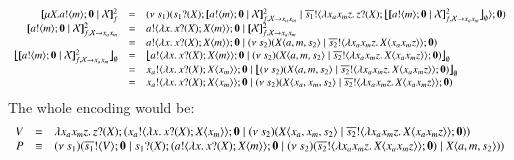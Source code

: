 \[
	\begin{array}{rcl}
		\pmapp{\recp{X}{\bout{a}{m} \inact \Par \rvar{X}}}{2}{f} & = &
		\newsp{s_1}{ \binp{s_1}{X} \pmapp{\bout{a}{m} \inact \Par \rvar{X}}{2}{f, \rvar{X} \rightarrow x_ax_m} \Par \bout{\dual{s_1}}{ \abs{x_a x_m z} \binp{z}{X} \auxmap{\pmapp{\bout{a}{m} \inact \Par \rvar{X}}{2}{f, \rvar{X} \rightarrow x_ax_m}}{\es} } \inact}
		\\

		\pmapp{\bout{a}{m} \inact \Par \rvar{X}}{2}{f, \rvar{X} \rightarrow x_ax_m} &=&
		\bout{a}{\abs{x}{\binp{x}{X} \appl{X}{m}}} \inact \Par \pmapp{\rvar{X}}{2}{f, \rvar{X} \rightarrow x_ax_m}
		\\
		&=& \bout{a}{\abs{x}{\binp{x}{X} \appl{X}{m}}} \inact \Par \newsp{s_2}{\appl{X}{a,m, s_2}  \Par \bout{\dual{s_2}}{\abs{x_a x_m z}{\appl{X}{x_a x_m z}}} \inact}
		\\

		\auxmap{\pmapp{\bout{a}{m} \inact \Par \rvar{X}}{2}{f, \rvar{X} \rightarrow x_ax_m}}{\es} &=&
		\auxmap{\bout{a}{\abs{x}{\binp{x}{X} \appl{X}{m}}} \inact \Par  \newsp{s_2}{\appl{X}{a,m, s_2}  \Par \bout{\dual{s_2}}{\abs{x_a x_m z}{\appl{X}{x_a x_m z}}} \inact}}{\es}
		\\
		& = & \bout{x_a}{\abs{x}{\binp{x}{X} \appl{X}{x_m}}} \inact \Par \auxmap{\newsp{s_2}{\appl{X}{a,m, s_2}  \Par \bout{\dual{s_2}}{\abs{x_a x_m z}{\appl{X}{x_a x_m z}}} \inact}}{\es}
		\\
		& = & \bout{x_a}{\abs{x}{\binp{x}{X} \appl{X}{x_m}}} \inact \Par \newsp{s_2}{\appl{X}{x_a,x_m, s_2}  \Par \bout{\dual{s_2}}{\abs{x_a x_m z}{\appl{X}{x_a x_m z}}} \inact}
	\end{array}
\]
\noi The whole encoding would be:
\[
	\begin{array}{rcl}
		V & = & \lambda x_a x_m z.\,z ? (X) ; (x_a ! \langle \lambda x.\,x ? (X) ; X\langle x_m \rangle \rangle ; \mathbf{0} \;|\; (\nu\ s_2)(X\langle x_a,x_m, s_2 \rangle  \;|\; \overline{s_2} ! \langle \lambda x_a x_m z.\,X\langle x_a x_m z \rangle \rangle ; \mathbf{0}))\\
		P & \equiv &
		(\nu\ s_1)(\overline{s_1} ! \langle V \rangle ; \mathbf{0} \;|\; s_1 ? (X) ; (a ! \langle \lambda x.\,x ? (X) ; X\langle m \rangle \rangle ; \mathbf{0} \;|\;  (\nu\ s_2)(\overline{s_2} ! \langle \lambda x_a x_m z.\,X\langle x_a x_m z \rangle \rangle ; \mathbf{0}) \;|\; X\langle a,m, s_2 \rangle))
	\end{array}
\]

